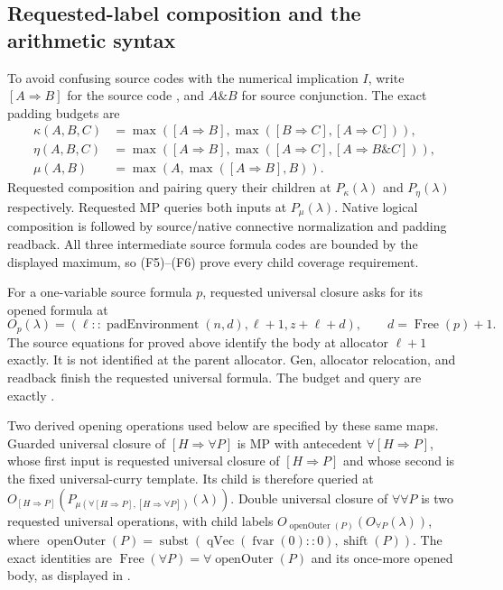 \subsection{Requested-label composition and the arithmetic syntax}

To avoid confusing source codes with the numerical implication $I$,
write $[A\Rightarrow B]$ for the source code
, and $A\mathbin\&B$ for source conjunction.
The exact padding budgets are
\begin{align*}
 \kappa(A,B,C)&=\max([A\Rightarrow B],
                         \max([B\Rightarrow C],[A\Rightarrow C])),\\
 \eta(A,B,C)&=\max([A\Rightarrow B],
                         \max([A\Rightarrow C],[A\Rightarrow B\mathbin\&C])),\\
 \mu(A,B)&=\max(A,\max([A\Rightarrow B],B)).
 \tag{F9}
\end{align*}
Requested composition and pairing query their children at
$P_\kappa(\lambda)$ and $P_\eta(\lambda)$ respectively.
Requested MP queries both inputs at $P_\mu(\lambda)$.
Native logical composition is followed by source/native connective
normalization and padding readback.  All three intermediate source
formula codes are bounded by the displayed maximum, so (F5)--(F6)
prove every child coverage requirement.

For a one-variable source formula $p$, requested universal closure
asks for its opened formula at
\[
 O_p(\lambda)=
 (\ell::\operatorname{padEnvironment}(n,d),\ell+1,z+\ell+d),
 \qquad d=\operatorname{Free}(p)+1.
 \tag{F10}
\]
The source equations for  proved above identify the
body at allocator $\ell+1$ exactly.  It is not identified at the
parent allocator.  Gen, allocator relocation, and readback finish
the requested universal formula.  The budget and query are exactly
.

Two derived opening operations used below are specified by these
same maps.  Guarded universal closure of $[H\Rightarrow\forall P]$
is MP with antecedent $\forall[H\Rightarrow P]$, whose first input
is requested universal closure of $[H\Rightarrow P]$ and whose
second is the fixed universal-curry template.  Its child is therefore
queried at
$O_{[H\Rightarrow P]}(P_{\mu(\forall[H\Rightarrow P],
 [H\Rightarrow\forall P])}(\lambda))$.
Double universal closure of $\forall\forall P$ is two requested
universal operations, with child labels
$O_{\operatorname{openOuter}(P)}(O_{\forall P}(\lambda))$,
where
$\operatorname{openOuter}(P)=
 \operatorname{subst}(\operatorname{qVec}(\operatorname{fvar}(0)::0),
                      \operatorname{shift}(P))$.
The exact identities are
$\operatorname{Free}(\forall P)=\forall\operatorname{openOuter}(P)$
and its once-more opened body, as displayed in
.

